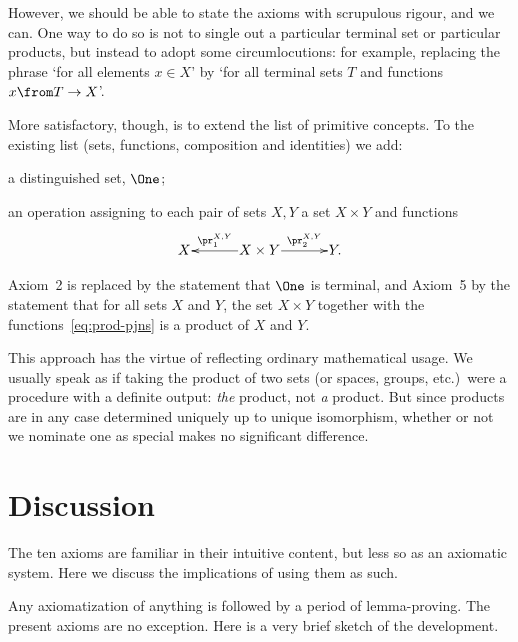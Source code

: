 \documentclass[12pt]{article}
\begin{document}
However, we should be able to state the axioms with scrupulous rigour, and
we can.  One way to do so is not to single out a particular terminal set or
particular products, but instead to adopt some circumlocutions: for
example, replacing the phrase `for all elements $x \in X$' by `for all
terminal sets $T$ and functions $x\from T \to X$'.

More satisfactory, though, is to extend the list of primitive concepts.  To
the existing list (sets, functions, composition and identities) we add:
% 
\fmlon
\begin{myitemize}

\item a distinguished set, $\One$;

\item an operation assigning to each pair of sets $X, Y$ a set $X
\times Y$ and functions
% 
\begin{equation}
\label{eq:prod-pjns}
\xymatrix@1@C+2ex{
X       &
\ar[l]_-{\pr^{X, Y}_1} X \times Y \ar[r]^-{\pr^{X, Y}_2}  &
Y.
}
\end{equation}

\end{myitemize}
\fmloff
% 
Axiom~2 is replaced by the statement that $\One$ is terminal, and
Axiom~5 by the statement that for all sets $X$ and $Y$, the set $X \times
Y$ together with the functions~\eqref{eq:prod-pjns} is a product of $X$ and
$Y$.  

This approach has the virtue of reflecting ordinary mathematical usage.  We
usually speak as if taking the product of two sets (or spaces, groups,
etc.)\ were a procedure with a definite output: \emph{the} product, not
\emph{a} product.  But since products are in any case determined uniquely
up to unique isomorphism, whether or not we nominate one as special makes
no significant difference.



\section{Discussion} 
\label{sec:rmks}


The ten axioms are familiar in their intuitive content, but less so
as an axiomatic system.  Here we discuss the implications of using them as
such. 


Any axiomatization of anything is followed by a period of lemma-proving.
The present axioms are no exception.  Here is a very brief sketch of the
development.
\end{document}
